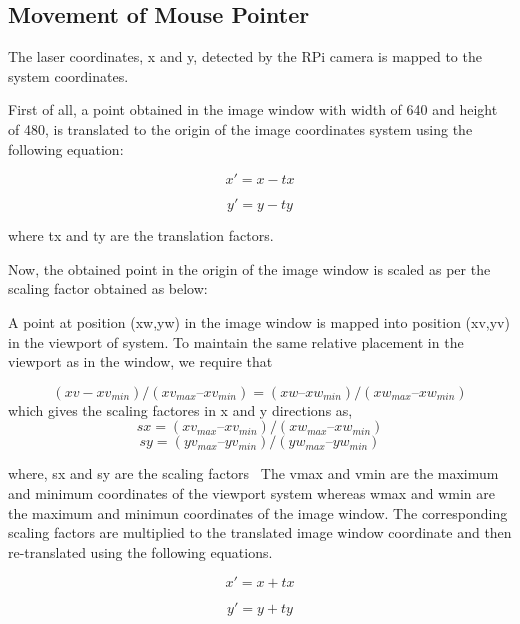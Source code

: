 \documentclass[12pt, a4paper]{article}
\begin{document}
\subsection{Movement of Mouse Pointer}
The laser coordinates, x and y, detected by the RPi camera is mapped to the system coordinates. 

First of all, a point obtained in the image window with width of 640 and height of 480, is translated to the origin of the image coordinates system using the following equation:

\begin{equation}
x' = x - tx
\end{equation}

\begin{equation}
y' = y - ty
\end{equation}

where tx and ty are the translation factors.

Now, the obtained point in the origin of the image window is scaled as per the scaling factor obtained as below:

A point at position (xw,yw) in the image window is mapped into position (xv,yv) in the viewport of system. To maintain the same relative placement in the viewport as in the window, we require that

\begin{equation}
 (xv -xv_{min})/(xv_{max} – xv_{min}) = (xw – xw_{min})/(xw_{max} – xw_{min})
\end{equation}
which gives the scaling factores in x and y directions as,
\begin{equation}
sx = (xv_{max} – xv_{min}) / (xw_{max} – xw_{min})
\end{equation}
\begin{equation}
sy = (yv_{max} – yv_{min}) / (yw_{max} – yw_{min})
\end{equation}

where, sx and sy are the scaling factors~\cite{hen}
The vmax and vmin are the maximum and minimum coordinates of the viewport system whereas wmax and wmin are the maximum and minimun coordinates of the image window. 
The corresponding scaling factors are multiplied to the translated image window coordinate and then re-translated using the following equations. 

\begin{equation}
x' = x + tx
\end{equation}

\begin{equation}
y' = y + ty
\end{equation}
\end{document}
